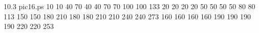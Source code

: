  10.3 pic16.ps 
{}{}{
 10 
 10 
 40 
 70 
 40 
 40 
 70 
 70 
 100 
 100 
 133 
 20 
 20 
 20 
 20 
 50 
 50 
 50 
 50 
 80 
 80 
 113 
 150 
 150 
 180 
 210 
 180 
 180 
 210 
 210 
 240 
 240 
 273 
 160 
 160 
 160 
 160 
 190 
 190 
 190 
 190 
 220 
 220 
 253 
}
